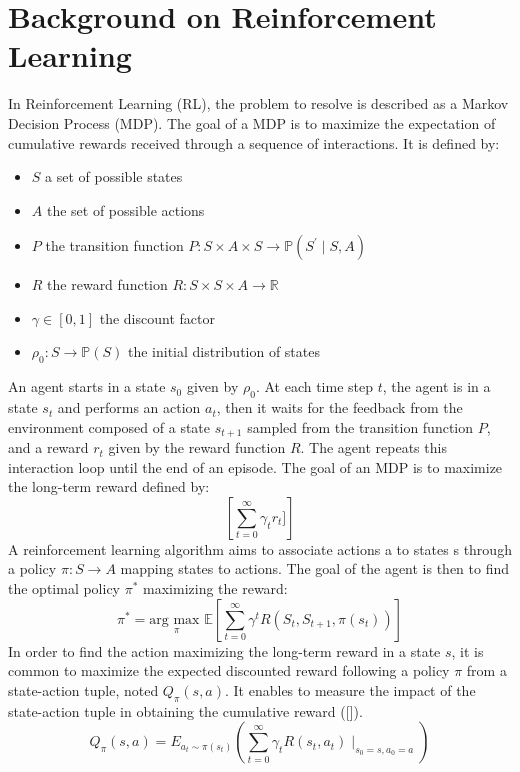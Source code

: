 \documentclass[conference]{IEEEtran}
\begin{document}
\section{Background on Reinforcement Learning} \label{sec:background}
In Reinforcement Learning (RL), the problem to resolve is described as a Markov Decision Process (MDP). The goal of a MDP is to maximize the expectation of cumulative rewards received through a sequence of interactions. It is defined by:
\begin{itemize}
\item $S$ a set of possible states
\item $A$ the set of possible actions
\item $P$ the transition function $P: S \times A \times S \to \mathbb{P}(S^{\prime}\mid{}S,A)$
\item $R$ the reward function $R: S \times S \times A \to \mathbb{R}$
\item $\gamma \in [0,1]$ the discount factor
\item $\rho_{0}: S \to \mathbb{P}(S)$ the initial distribution of states
\end{itemize}
An agent starts in a state $s_0$ given by $\rho_0$. At each time step $t$, the agent is in a state $s_t$ and performs an action $a_t$, then it waits for the feedback from the environment composed of a state $s_{t+1}$ sampled from the transition function $P$, and a reward $r_t$ given by the reward function $R$. The agent repeats this interaction loop until the end of an episode.
The goal of an MDP is to maximize the long-term reward defined by:
\begin{equation*}
    \left[\sum_{t=0}^{\infty} \gamma_{t}r_t]\right]
\end{equation*}
A reinforcement learning algorithm aims to associate actions a to states s through a policy $\pi: S \to A$ mapping states to actions. The goal of the agent is then to find the optimal policy $\pi^{\ast}$ maximizing the reward:
\begin{equation*}
    \pi^{\ast} = \underset{\pi}{\text{arg max }} \mathbb{E}\left[\sum_{t=0}^{\infty}\gamma^{t}R(S_t,S_{t+1},\pi(s_t))\right]
\end{equation*}
In order to find the action maximizing the long-term reward in a state $s$, it is common to maximize the expected discounted reward following a policy $\pi$ from a state-action tuple, noted $Q_{\pi}(s, a)$. It enables to measure the impact of the state-action tuple in obtaining the cumulative reward ([\cite{sutton2018reinforcement}]).
\begin{equation*}
    Q_{\pi}(s, a) = E_{a_{t}\sim\pi(s_t)}\left( \sum_{t=0}^{\infty}\gamma_{t}R(s_t,a_t)\mid_{s_0=s,a_0=a}\right)
\end{equation*}
\end{document}
